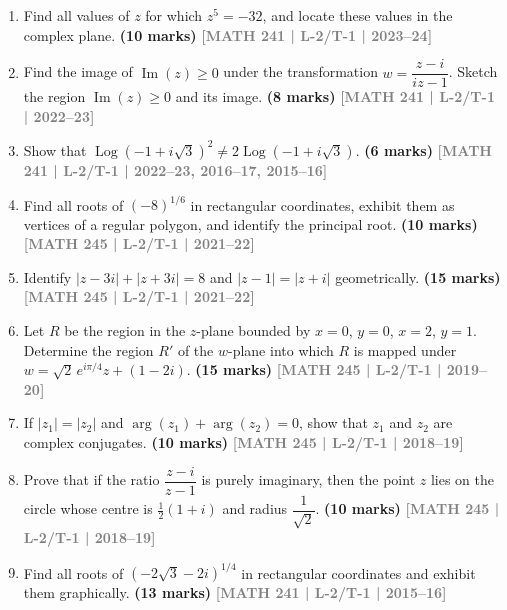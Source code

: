 \documentclass[12pt]{article}
\newcommand{\yr}[1]{\hfill\textcolor{gray}{\small\textbf{[#1]}}}
\newcommand{\mk}[1]{\textcolor{orange!70!black}{\small\textbf{(#1 marks)}}}
\begin{document}
\begin{enumerate}

\item Find all values of $z$ for which $z^{5}=-32$, and locate these values in the complex plane.
\mk{10} \yr{MATH 241 | L-2/T-1 | 2023--24}



\item Find the image of $\operatorname{Im}(z)\ge 0$ under the transformation $w=\dfrac{z-i}{iz-1}$. Sketch the region $\operatorname{Im}(z)\ge 0$ and its image.
\mk{8} \yr{MATH 241 | L-2/T-1 | 2022--23}



\item Show that $\operatorname{Log}(-1+i\sqrt{3})^{2}\neq 2\operatorname{Log}(-1+i\sqrt{3})$.
\mk{6} \yr{MATH 241 | L-2/T-1 | 2022--23, 2016--17, 2015--16}




\item Find all roots of $(-8)^{1/6}$ in rectangular coordinates, exhibit them as vertices of a regular polygon, and identify the principal root.
\mk{10} \yr{MATH 245 | L-2/T-1 | 2021--22}



\item Identify $|z-3i|+|z+3i|=8$ and $|z-1|=|z+i|$ geometrically.
\mk{15} \yr{MATH 245 | L-2/T-1 | 2021--22}



\item Let $R$ be the region in the $z$-plane bounded by $x=0$, $y=0$, $x=2$, $y=1$. Determine the region $R'$ of the $w$-plane into which $R$ is mapped under $w=\sqrt{2}\,e^{i\pi/4}z+(1-2i)$.
\mk{15} \yr{MATH 245 | L-2/T-1 | 2019--20}



\item If $|z_{1}|=|z_{2}|$ and $\arg(z_{1})+\arg(z_{2})=0$, show that $z_{1}$ and $z_{2}$ are complex conjugates.
\mk{10} \yr{MATH 245 | L-2/T-1 | 2018--19}



\item Prove that if the ratio $\dfrac{z-i}{z-1}$ is purely imaginary, then the point $z$ lies on the circle whose centre is $\tfrac{1}{2}(1+i)$ and radius $\dfrac{1}{\sqrt{2}}$.
\mk{10} \yr{MATH 245 | L-2/T-1 | 2018--19}



\item Find all roots of $(-2\sqrt{3}-2i)^{1/4}$ in rectangular coordinates and exhibit them graphically.
\mk{13} \yr{MATH 241 | L-2/T-1 | 2015--16}




\end{enumerate}
\end{document}
